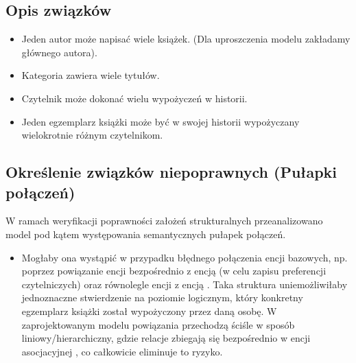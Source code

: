 \documentclass[a4paper,11pt,english,openany,oneside]{sphinxmanual}
\begin{document}
\subsection{Opis związków}
\label{\detokenize{rozdzial_3/index:opis-zwiazkow}}\begin{itemize}
\item {} 
\sphinxAtStartPar
{} Jeden autor może napisać wiele książek. (Dla uproszczenia modelu zakładamy głównego autora).

\item {} 
\sphinxAtStartPar
{} Kategoria zawiera wiele tytułów.

\item {} 
\sphinxAtStartPar
{} Czytelnik może dokonać wielu wypożyczeń w historii.

\item {} 
\sphinxAtStartPar
{} Jeden egzemplarz książki może być w swojej historii wypożyczany wielokrotnie różnym czytelnikom.

\end{itemize}


\subsection{Określenie związków niepoprawnych (Pułapki połączeń)}
\label{\detokenize{rozdzial_3/index:okreslenie-zwiazkow-niepoprawnych-pulapki-polaczen}}
\sphinxAtStartPar
W ramach weryfikacji poprawności założeń strukturalnych przeanalizowano model pod kątem występowania semantycznych pułapek połączeń.
\begin{itemize}
\item {} 
\sphinxAtStartPar
{} Mogłaby ona wystąpić w przypadku błędnego połączenia encji bazowych, np. poprzez powiązanie encji  bezpośrednio z encją  (w celu zapisu preferencji czytelniczych) oraz równolegle encji  z encją . Taka struktura uniemożliwiłaby jednoznaczne stwierdzenie na poziomie logicznym, który konkretny egzemplarz książki został wypożyczony przez daną osobę. W zaprojektowanym modelu powiązania przechodzą ściśle w sposób liniowy/hierarchiczny, gdzie relacje zbiegają się bezpośrednio w encji asocjacyjnej , co całkowicie eliminuje to ryzyko.

\end{itemize}
\end{document}
